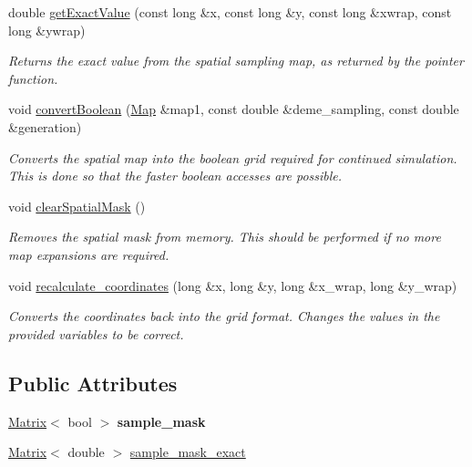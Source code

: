 \begin{DoxyCompactItemize}
double \hyperlink{class_data_mask_a2738d996bf7ee99d44a2833b2bed15ef}{get\+Exact\+Value} (const long \&x, const long \&y, const long \&xwrap, const long \&ywrap)
\begin{DoxyCompactList}\small\item\em Returns the exact value from the spatial sampling map, as returned by the pointer function. \end{DoxyCompactList}\item 
void \hyperlink{class_data_mask_a9de1eec774b8307f63357d2eff514b93}{convert\+Boolean} (\hyperlink{class_map}{Map} \&map1, const double \&deme\+\_\+sampling, const double \&generation)
\begin{DoxyCompactList}\small\item\em Converts the spatial map into the boolean grid required for continued simulation. This is done so that the faster boolean accesses are possible. \end{DoxyCompactList}\item 
void \hyperlink{class_data_mask_a2d152bcb13820a9061ea85c984e042a7}{clear\+Spatial\+Mask} ()\hypertarget{class_data_mask_a2d152bcb13820a9061ea85c984e042a7}{}\label{class_data_mask_a2d152bcb13820a9061ea85c984e042a7}

\begin{DoxyCompactList}\small\item\em Removes the spatial mask from memory. This should be performed if no more map expansions are required. \end{DoxyCompactList}\item 
void \hyperlink{class_data_mask_ab96af629241f61a4d7122c6b7a91a3ef}{recalculate\+\_\+coordinates} (long \&x, long \&y, long \&x\+\_\+wrap, long \&y\+\_\+wrap)
\begin{DoxyCompactList}\small\item\em Converts the coordinates back into the grid format. Changes the values in the provided variables to be correct. \end{DoxyCompactList}\end{DoxyCompactItemize}
\subsection*{Public Attributes}
\begin{DoxyCompactItemize}
\item 
\hyperlink{class_matrix}{Matrix}$<$ bool $>$ {\bfseries sample\+\_\+mask}\hypertarget{class_data_mask_ac4852ba45532f4ec91751df868b11303}{}\label{class_data_mask_ac4852ba45532f4ec91751df868b11303}

\item 
\hyperlink{class_matrix}{Matrix}$<$ double $>$ \hyperlink{class_data_mask_a28b2136c9666ec5188dd3301e1db602a}{sample\+\_\+mask\+\_\+exact}
\end{DoxyCompactItemize}

